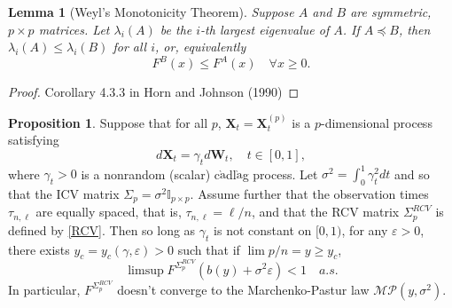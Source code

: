 \documentclass[a4paper,11pt]{article}
\theoremstyle{plain}
\newtheorem{lmm}[thm]{Lemma}
\theoremstyle{definition}
\newtheorem{prps}[thm]{Proposition}
\begin{document}
	\begin{lmm}[Weyl's Monotonicity Theorem]
		Suppose $A$ and $B$ are symmetric, $p \times p$ matrices. Let $\lambda_i(A)$ be the $i$-th largest eigenvalue of $A$. If $A \preceq B$, then $\lambda_i(A) \leq \lambda_i(B)$ for all $i$, or, equivalently
		\[ F^B(x) \leq F^A(x) \quad \forall x \geq 0. \]
    \end{lmm}
    \begin{proof}
    	Corollary 4.3.3 in Horn and Johnson (1990)
    \end{proof}
		
	\begin{prps}
		Suppose that for all $p$, $\mathbf{X}_t=\mathbf{X}_t^{(p)}$ is a $p$-dimensional process satisfying
		\begin{equation}
		d \mathbf{X}_t = \gamma_t d\mathbf{W}_t, \quad t \in [0, 1],
		\end{equation}
		where $\gamma_t > 0$ is a nonrandom (scalar) c$\grave{\text{a}}$dl$\grave{\text{a}}$g process. Let $\sigma^2 = \int_0^1 \gamma_t^2 dt$ and so that the ICV matrix $\Sigma_p = \sigma^2 \mathbb{I}_{p \times p}$. Assume further that the observation times $\tau_{n,\ell}$ are equally spaced, that is, $\tau_{n, \ell} = \ell / n$, and that the RCV matrix $\Sigma_p^{RCV}$ is defined by \eqref{RCV}. Then so long as $\gamma_t$ is not constant on $[0, 1)$, for any $\varepsilon > 0$, there exists $y_c = y_c(\gamma, \varepsilon) > 0$ such that if $\lim p/n = y \geq y_c$,
		\begin{equation}
			\limsup F^{\Sigma_p^{RCV}}(b(y)+\sigma^2\varepsilon) < 1 \quad a.s.
		\end{equation}
		In particular, $F^{\Sigma_p^{RCV}}$ doesn't converge to the Marchenko-Pastur law $\mathcal{MP}(y, \sigma^2)$.
    \end{prps}
    
\end{document}
